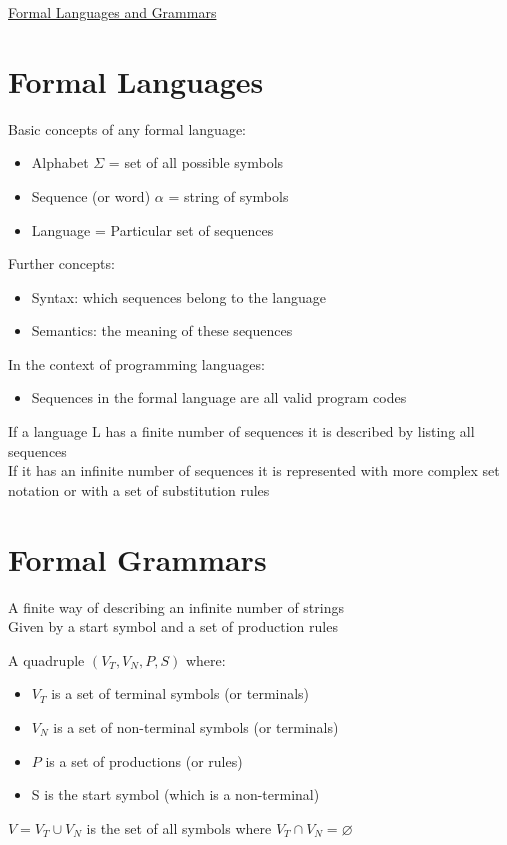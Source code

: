 \documentclass{article}[18pt]
\begin{document}
\begin{center}
\underline{\huge Formal Languages and Grammars}
\end{center}
\section{Formal Languages}
Basic concepts of any formal language:
\begin{itemize}
	\item Alphabet $\Sigma$ = set of all possible symbols
	\item Sequence (or word) $\alpha$ = string of symbols
	\item Language = Particular set of sequences
\end{itemize} 
Further concepts:
\begin{itemize}
	\item Syntax: which sequences belong to the language
	\item Semantics: the meaning of these sequences
\end{itemize}
In the context of programming languages:
\begin{itemize}
	\item Sequences in the formal language are all valid program codes
\end{itemize}
If a language L has a finite number of sequences it is described by listing all sequences\\
If it has an infinite number of sequences it is represented with more complex set notation or with a set of substitution rules
\section{Formal Grammars}
\begin{definition}
	A finite way of describing an infinite number of strings\\
	Given by a start symbol and a set of production rules
\end{definition}

\begin{definition}[Grammar]
A quadruple $(V_T,V_N,P,S)$ where:
\begin{itemize}
	\item $V_T$ is a set of terminal symbols (or terminals)
	\item $V_N$ is a set of non-terminal symbols (or terminals)
	\item $P$ is a set of productions (or rules)
	\item S is the start symbol (which is a non-terminal)
\end{itemize}
\end{definition}
$V=V_T\cup V_N$ is the set of all symbols where $V_T\cap V_N=\varnothing$
\end{document}
